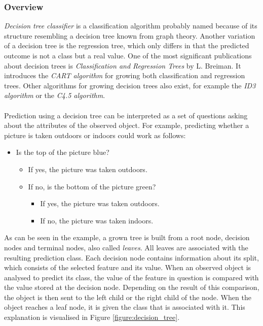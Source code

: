\documentclass[11pt]{article}
\begin{document}
      \subsubsection{Overview}
        {\it Decision tree classifier} is a classification algorithm probably named because of its structure resembling a decision tree known from graph theory. Another variation of a decision tree is the regression tree, which only differs in that the predicted outcome is not a class but a real value. One of the most significant publications about decision trees is {\it Classification and Regression Trees} by L. Breiman. It introduces the {\it CART algorithm} for growing both classification and regression trees. \cite{cart} Other algorithms for growing decision trees also exist, for example the {\it ID3 algorithm} or the {\it C4.5 algorithm}.
        \\~\\
        Prediction using a decision tree can be interpreted as a set of questions asking about the attributes of the observed object. For example, predicting whether a picture is taken outdoors or indoors could work as follows:
        \begin{itemize}
          \item Is the top of the picture blue?
          \begin{itemize}
            \item If yes, the picture was taken outdoors.
            \item If no, is the bottom of the picture green?
            \begin{itemize}
              \item If yes, the picture was taken outdoors.
              \item If no, the picture was taken indoors.
            \end{itemize}
          \end{itemize}
        \end{itemize}
        As can be seen in the example, a grown tree is built from a root node, decision nodes and terminal nodes, also called {\it leaves}. All leaves are associated with the resulting prediction class. Each decision node contains information about its split, which consists of the selected feature and its value. When an observed object is analysed to predict its class, the value of the feature in question is compared with the value stored at the decision node. Depending on the result of this comparison, the object is then sent to the left child or the right child of the node. When the object reaches a leaf node, it is given the class that is associated with it. This explanation is visualised in Figure \ref{figure:decision_tree}.
\end{document}
